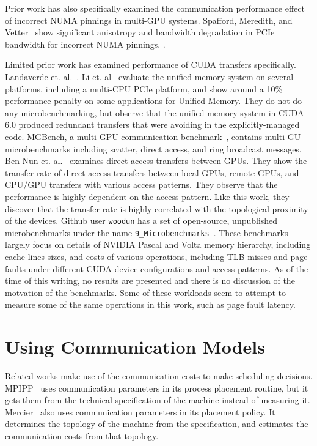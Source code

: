 Prior work has also specifically examined the communication performance effect of incorrect NUMA pinnings in multi-GPU systems.
Spafford, Meredith, and Vetter~\cite{spafford2011quantifying} show significant anisotropy and bandwidth degradation in PCIe bandwidth for incorrect NUMA pinnings. .

Limited prior work has examined performance of CUDA transfers specifically.
Landaverde et. al.~\cite{landaverde2014investigation}.
Li et. al~\cite{li2015evaluation} evaluate the unified memory system on several platforms, including a multi-CPU PCIe platform, and show around a 10\% performance penalty on some applications for Unified Memory.
They do not do any microbenchmarking, but observe that the unified memory system in CUDA 6.0 produced redundant transfers that were avoiding in the explicitly-managed code.
MGBench, a multi-GPU communication benchmark~\cite{bennun2016mgbench}, contains multi-GU microbenchmarks including scatter, direct access, and ring broadcast messages.
Ben-Nun et. al.~\cite{ben2017groute} examines direct-access transfers between GPUs.
They show the transfer rate of direct-access transfers between local GPUs, remote GPUs, and CPU/GPU transfers with various access patterns.
They observe that the performance is highly dependent on the access pattern.
Like this work, they discover that the transfer rate is highly correlated with the topological proximity of the devices.
Github user \texttt{woodun} has a set of open-source, unpublished microbenchmarks under the name \texttt{9\_Microbenchmarks}~\cite{woodun2018microbenchmarks}.
These benchmarks largely focus on details of NVIDIA Pascal and Volta memory hierarchy, including cache lines sizes, and costs of various operations, including TLB misses and page faults under different CUDA device configurations and access patterns.
As of the time of this writing, no results are presented and there is no discussion of the motvation of the benchmarks.
Some of these workloads seem to attempt to measure some of the same operations in this work, such as page fault latency.

\section{Using Communication Models}

Related works make use of the communication costs to make scheduling decisions.
MPIPP~\cite{chen2006mpipp} uses communication parameters in its process placement routine, but it gets them from the technical specification of the machine instead of measuring it.
Mercier~\cite{mercier2009towards} also uses communication parameters in its placement policy.
It determines the topology of the machine from the specification, and estimates the communication costs from that topology.

